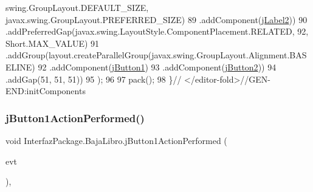 \begin{DoxyCode}
      swing.GroupLayout.DEFAULT\_SIZE, javax.swing.GroupLayout.PREFERRED\_SIZE)
89                     .addComponent(\mbox{\hyperlink{class_interfaz_package_1_1_baja_libro_a6338f6b6d9f81c8b561ffeaa3e70b42d}{jLabel2}}))
90                 .addPreferredGap(javax.swing.LayoutStyle.ComponentPlacement.RELATED, 92, Short.MAX\_VALUE)
91                 .addGroup(layout.createParallelGroup(javax.swing.GroupLayout.Alignment.BASELINE)
92                     .addComponent(\mbox{\hyperlink{class_interfaz_package_1_1_baja_libro_ad62adfcc532334f669bfaf40af59fa81}{jButton1}})
93                     .addComponent(\mbox{\hyperlink{class_interfaz_package_1_1_baja_libro_a2da0b911c31a5ee87f05b4a630fa5b2d}{jButton2}}))
94                 .addGap(51, 51, 51))
95         );
96 
97         pack();
98     \}\textcolor{comment}{// </editor-fold>//GEN-END:initComponents}
\end{DoxyCode}
\mbox{\label{class_interfaz_package_1_1_baja_libro_af574e4504923035ec61a72af0a5885ab}} 
\subsubsection{\texorpdfstring{j\+Button1\+Action\+Performed()}{jButton1ActionPerformed()}}
{\footnotesize\ttfamily void Interfaz\+Package.\+Baja\+Libro.\+j\+Button1\+Action\+Performed (\begin{DoxyParamCaption}\item[{java.\+awt.\+event.\+Action\+Event}]{evt }\end{DoxyParamCaption})\hspace{0.3cm}{\ttfamily [inline]}, {\ttfamily [private]}}


